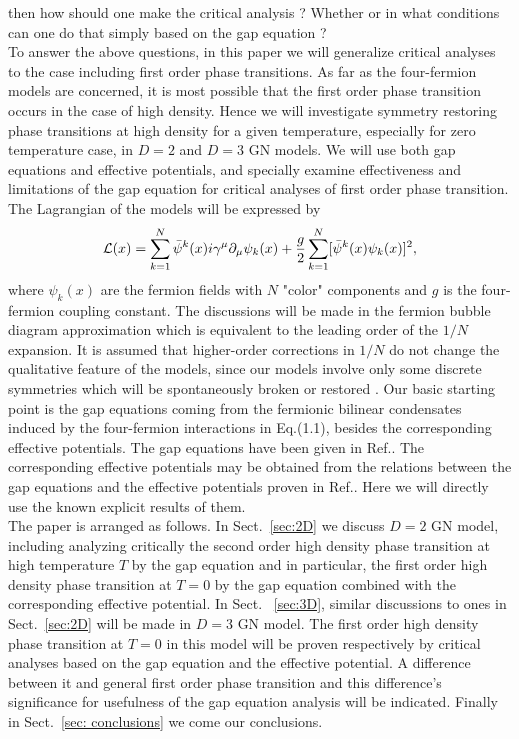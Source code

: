 \documentclass[a4paper,eqsecnum]{revtex4}
\begin{document}
then how should one make the critical analysis ?  Whether or in what conditions can 
one do that simply based on the gap equation ?  \\
\indent To answer the above questions, in this paper we will generalize 
critical analyses to the case including first order phase transitions. As far as the 
four-fermion models are concerned, it is most possible that the first order phase 
transition occurs in the case of high density. Hence we will investigate symmetry 
restoring phase transitions at high density for a given temperature, especially for 
zero temperature case, in $D=2$ and $D=3$ GN models. We will use both gap equations 
and effective potentials, and specially examine effectiveness and limitations of the 
gap equation for critical analyses of first order phase transition. \\
\indent The Lagrangian of the models will be expressed by
\begin{equation}
{\cal L}(x)=\sum_{k=1}^N\bar{\psi}^k(x)i\gamma^{\mu}\partial_{\mu}\psi_k(x)+
              \frac{g}{2}\sum_{k=1}^N[\bar{\psi}^k(x)\psi_k(x)]^2,
\end{equation}%
where $\psi_k(x)$  are the fermion fields with $N$ "color" components and $g$ is 
the four-fermion coupling constant. The discussions will be made in the fermion bubble 
diagram approximation which is equivalent to the leading order of the $1/N$ expansion. 
It is assumed that higher-order corrections in $1/N$ do not change the qualitative 
feature of the models, since our models involve only some discrete symmetries which 
will be spontaneously broken or restored \cite{kn:18}. Our basic starting point is 
the gap equations coming from the fermionic bilinear condensates induced by the 
four-fermion interactions in Eq.(1.1), besides the corresponding effective 
potentials. The gap equations have been given in Ref.\cite{kn:16,kn:17}.  The 
corresponding effective potentials may be obtained from the relations between the 
gap equations and the effective potentials proven in Ref.\cite{kn:14}. Here we will 
directly use the known explicit results of them. \\
\indent The paper is arranged as follows. In Sect.~\ref{sec:2D} we discuss $D=2$ GN 
model, including analyzing critically the second order high density phase transition 
at high temperature $T$ by the gap equation and in particular, the first order high density phase transition at $T=0$ by the gap equation combined with the corresponding 
effective potential.  In Sect. ~\ref{sec:3D}, similar discussions to ones 
in Sect.~\ref{sec:2D} will be made in $D=3$ GN model. The first order high density 
phase transition at $T=0$ in this model will be proven respectively by critical 
analyses based on the gap equation and the effective potential. A difference between 
it and general first order phase transition and this difference's significance for 
usefulness of the gap equation analysis will be indicated. Finally in 
Sect.~\ref{sec: conclusions} we come our conclusions. 
\end{document}
